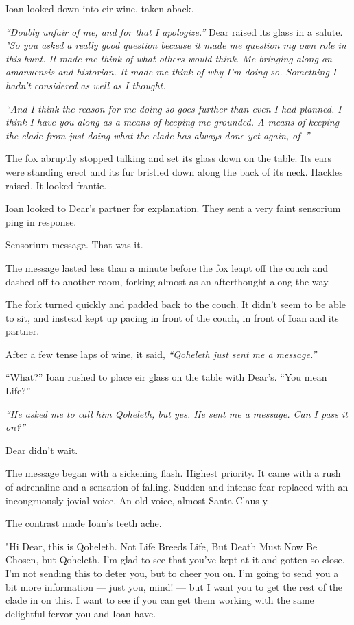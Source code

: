 Ioan looked down into eir wine, taken aback.

\emph{``Doubly unfair of me, and for that I apologize.''} Dear raised its glass in a salute. \emph{"So you asked a really good question because it made me question my own role in this hunt. It made me think of what others would think. Me bringing along an amanuensis and historian. It made me think of why I'm doing so. Something I hadn't considered as well as I thought.}

\emph{``And I think the reason for me doing so goes further than even I had planned. I think I have you along as a means of keeping me grounded. A means of keeping the clade from just doing what the clade has always done yet again, of--''}

The fox abruptly stopped talking and set its glass down on the table. Its ears were standing erect and its fur bristled down along the back of its neck. Hackles raised. It looked frantic.

Ioan looked to Dear's partner for explanation. They sent a very faint sensorium ping in response.

Sensorium message. That was it.

The message lasted less than a minute before the fox leapt off the couch and dashed off to another room, forking almost as an afterthought along the way.

The fork turned quickly and padded back to the couch. It didn't seem to be able to sit, and instead kept up pacing in front of the couch, in front of Ioan and its partner.

After a few tense laps of wine, it said, \emph{``Qoheleth just sent me a message.''}

``What?'' Ioan rushed to place eir glass on the table with Dear's. ``You mean Life?''

\emph{``He asked me to call him Qoheleth, but yes. He sent me a message. Can I pass it on?''}

Dear didn't wait.

The message began with a sickening flash. Highest priority. It came with a rush of adrenaline and a sensation of falling. Sudden and intense fear replaced with an incongruously jovial voice. An old voice, almost Santa Claus-y.

The contrast made Ioan's teeth ache.

"Hi Dear, this is Qoheleth. Not Life Breeds Life, But Death Must Now Be Chosen, but Qoheleth. I'm glad to see that you've kept at it and gotten so close. I'm not sending this to deter you, but to cheer you on. I'm going to send you a bit more information — just you, mind! — but I want you to get the rest of the clade in on this. I want to see if you can get them working with the same delightful fervor you and Ioan have.

